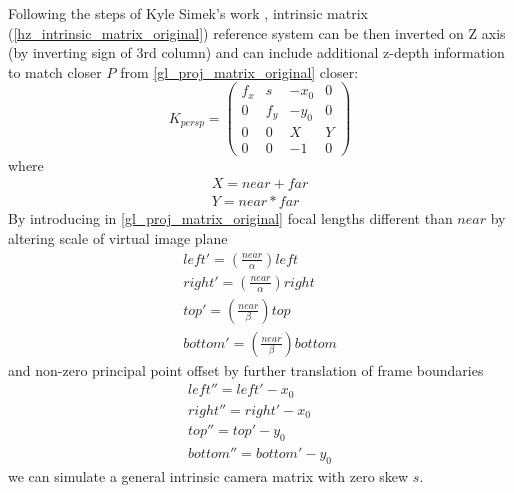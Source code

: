 Following the steps of Kyle Simek's work \cite{link_dissecting_camera_matrix}, intrinsic matrix (\ref{hz_intrinsic_matrix_original}) reference system can be then inverted on Z axis (by inverting sign of 3rd column) and can include additional z-depth information to match closer $P$ from \ref{gl_proj_matrix_original} closer:
\begin{equation}
K_{persp} = \left( \begin{array}{cccc} f_x & s & -x_0 & 0 \\ 0 & f_y & -y_0 & 0 \\ 0 & 0 & X & Y \\ 0 & 0 & -1 & 0 \end{array} \right)
\label{hz_intrinsic_matrix_extended}
\end{equation}
where
\begin{equation}
\begin{array}{c}
X = near + far \\
Y = near * far
\end{array}
\label{hz_intrinsic_matrix_extended_details}
\end{equation}
By introducing in \ref{gl_proj_matrix_original} focal lengths different than $near$ by altering scale of virtual image plane
\begin{equation}
\begin{array}{c}
left' = (\frac{near}{\alpha}) left \\
right' = (\frac{near}{\alpha}) right \\
top' = (\frac{near}{\beta}) top \\
bottom' = (\frac{near}{\beta}) bottom
\end{array}
\label{near_alter_scale}
\end{equation}
and non-zero principal point offset by further translation of frame boundaries
\begin{equation}
\begin{array}{c}
left'' = left' - x_0 \\
right'' = right' - x_0 \\
top'' = top' - y_0 \\
bottom'' = bottom' - y_0
\end{array}
\label{near_alter_offset}
\end{equation}
we can simulate a general intrinsic camera matrix with zero skew $s$.

